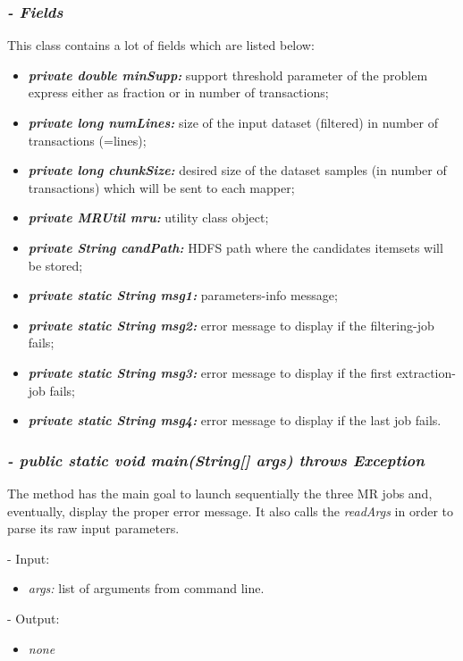 \documentclass[]{report}
\begin{document}
	\subsubsection*{\textit{\textbf{-} Fields}} 
	This class contains a lot of fields which are listed below:
	\begin{itemize}
		\item \textit{\textbf{private double minSupp:}} support threshold parameter of the problem express either as fraction or in number of transactions;
		\item \textit{\textbf{private long numLines:}} size of the input dataset (filtered) in number of transactions (=lines); 
		\item \textit{\textbf{private long chunkSize:}} desired size of the dataset samples (in number of transactions) which will be sent to each mapper;
		\item \textit{\textbf{private MRUtil mru:}} utility class object;
		\item \textit{\textbf{private String candPath:}} HDFS path where the candidates itemsets will be stored;
		\item \textit{\textbf{private static String msg1:}} parameters-info message;
		\item \textit{\textbf{private static String msg2:}} error message to display if the filtering-job fails;
		\item \textit{\textbf{private static String msg3:}} error message to display if the first extraction-job fails; 
		\item \textit{\textbf{private static String msg4:}} error message to display if the last job fails.	
	\end{itemize}

	\subsubsection*{\textit{\textbf{-} public static void main(String[] args) throws Exception}}
	The method has the main goal to launch sequentially the three MR jobs and, eventually, display the proper error message. It also calls the \textit{readArgs} in order to parse its raw input parameters.  
	\begin{description}
		\item - Input:
		\begin{itemize}
			\item \textit{args:} list of arguments from command line.
		\end{itemize}
	\end{description}
	\begin{description}
		\item - Output:
		\begin{itemize}
			\item \textit{none} 
		\end{itemize}
	\end{description}
\end{document}
